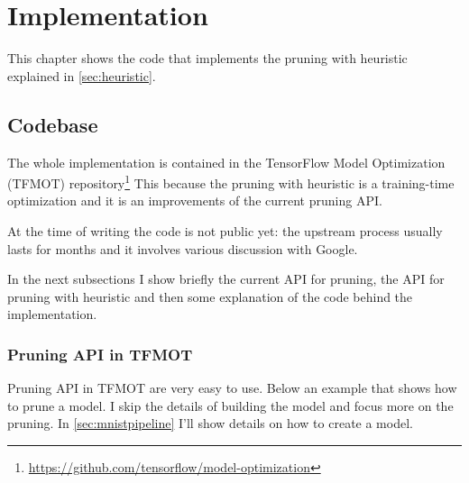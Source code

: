 \chapter{Implementation}\label{ch:implementation}
This chapter shows the code that implements the pruning with heuristic
explained in \autoref{sec:heuristic}.

\section{Codebase}
The whole implementation is contained in the TensorFlow Model Optimization
(TFMOT)
repository\footnote{\url{https://github.com/tensorflow/model-optimization}}
This because the pruning with heuristic is a training-time optimization and it
is an improvements of the current pruning API\@.

At the time of writing the code is not public yet: the upstream process usually
lasts for months and it involves various discussion with Google.

In the next subsections I show briefly the current API for pruning, the API for
pruning with heuristic and then some explanation of the code behind the
implementation.

\subsection{Pruning API in TFMOT}
Pruning API in TFMOT are very easy to use. Below an example that shows how to
prune a model. I skip the details of building the model and focus more on the
pruning. In \autoref{sec:mnistpipeline} I'll show details on how to create a
model.

